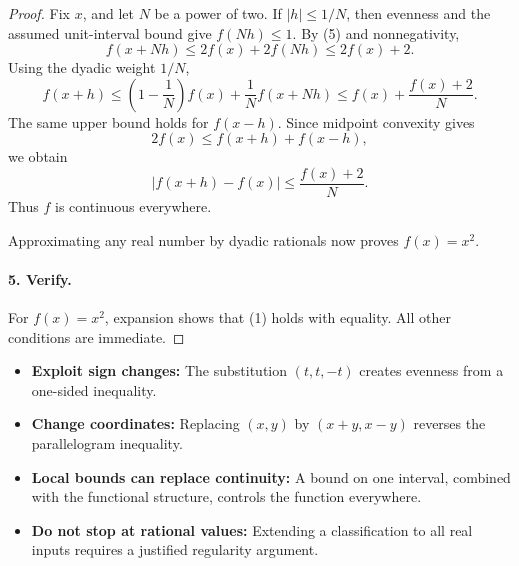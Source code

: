 \begin{dlsummary}[title={\bfseries Solution 47. The Three-Variable Quadratic Trap},breakable]
\begin{proof}
Fix \(x\), and let \(N\) be a power of two. If \(|h|\le1/N\), then evenness and the assumed unit-interval bound give \(f(Nh)\le1\). By (5) and nonnegativity,
\[
f(x+Nh)\le2f(x)+2f(Nh)\le2f(x)+2.
\]
Using the dyadic weight \(1/N\),
\[
f(x+h)\le
\left(1-\frac1N\right)f(x)+\frac1N f(x+Nh)
\le f(x)+\frac{f(x)+2}{N}.
\]
The same upper bound holds for \(f(x-h)\). Since midpoint convexity gives
\[
2f(x)\le f(x+h)+f(x-h),
\]
we obtain
\[
|f(x+h)-f(x)|\le\frac{f(x)+2}{N}.
\]
Thus \(f\) is continuous everywhere.

Approximating any real number by dyadic rationals now proves \(f(x)=x^2\).

\paragraph{5. Verify.}

For \(f(x)=x^2\), expansion shows that (1) holds with equality. All other conditions are immediate.
\end{proof}
\end{dlsummary}

\begin{takeaways}
\begin{itemize}
\item \textbf{Exploit sign changes:} The substitution \((t,t,-t)\) creates evenness from a one-sided inequality.
\item \textbf{Change coordinates:} Replacing \((x,y)\) by \((x+y,x-y)\) reverses the parallelogram inequality.
\item \textbf{Local bounds can replace continuity:} A bound on one interval, combined with the functional structure, controls the function everywhere.
\item \textbf{Do not stop at rational values:} Extending a classification to all real inputs requires a justified regularity argument.
\end{itemize}
\end{takeaways}
